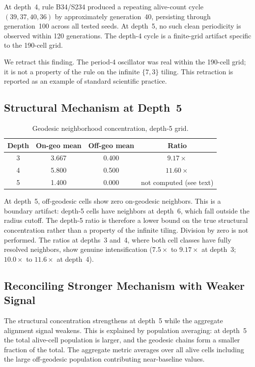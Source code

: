 \documentclass[12pt,a4paper]{article}
\begin{document}
At depth~4, rule B34/S234 produced a repeating alive-count cycle $(39,37,40,36)$ by approximately generation~40, persisting through generation~100 across all tested seeds. At depth~5, no such clean periodicity is observed within 120 generations. The depth-4 cycle is a finite-grid artifact specific to the 190-cell grid.

We retract this finding. The period-4 oscillator was real within the 190-cell grid; it is not a property of the rule on the infinite $\{7,3\}$ tiling. This retraction is reported as an example of standard scientific practice.

\subsection{Structural Mechanism at Depth~5}

\begin{table}[h]
\centering
\caption{Geodesic neighborhood concentration, depth-5 grid.}
\label{tab:depth5struct}
\begin{tabular}{cccc}
\toprule
Depth & On-geo mean & Off-geo mean & Ratio \\
\midrule
3 & 3.667 & 0.400 & $9.17\times$ \\
4 & 5.800 & 0.500 & $11.60\times$ \\
5 & 1.400 & 0.000 & not computed (see text) \\
\bottomrule
\end{tabular}
\end{table}

At depth~5, off-geodesic cells show zero on-geodesic neighbors. This is a boundary artifact: depth-5 cells have neighbors at depth~6, which fall outside the radius cutoff. The depth-5 ratio is therefore a lower bound on the true structural concentration rather than a property of the infinite tiling. Division by zero is not performed. The ratios at depths~3 and~4, where both cell classes have fully resolved neighbors, show genuine intensification ($7.5\times$ to $9.17\times$ at depth~3; $10.0\times$ to $11.6\times$ at depth~4).

\subsection{Reconciling Stronger Mechanism with Weaker Signal}

The structural concentration strengthens at depth~5 while the aggregate alignment signal weakens. This is explained by population averaging: at depth~5 the total alive-cell population is larger, and the geodesic chains form a smaller fraction of the total. The aggregate metric averages over all alive cells including the large off-geodesic population contributing near-baseline values.
\end{document}
